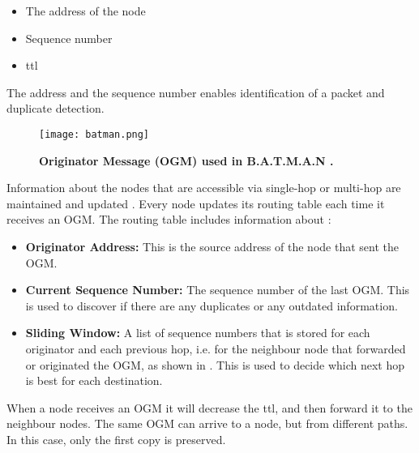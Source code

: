 \begin{itemize}
\item The address of the node
\item Sequence number
\item \gls{ttl} 
\end{itemize}

The address and the sequence number enables identification of a packet and duplicate detection. 

\begin{figure}[b]
  \centering
    \texttt{[image: batman.png]}
     \caption[Originator Message in B.A.T.M.A.N]{\textbf{Originator Message (OGM) used in B.A.T.M.A.N \cite{batman2}.}}
\label{fig:batman} 
\end{figure}


Information about the nodes that are accessible via single-hop or multi-hop are maintained and updated \cite{batman}. Every node updates its routing table each time it receives an OGM. The routing table includes information about \cite{batman2}:

\begin{itemize}
  \item \textbf{Originator Address:} This is the source address of the node that sent the OGM.
  \item \textbf{Current Sequence Number:} The sequence number of the last OGM. This is used to discover if there are any duplicates or any outdated information.
  \item \textbf{Sliding Window:} A list of sequence numbers that is stored for each originator and each previous hop, i.e. for the neighbour node that forwarded or originated the OGM, as shown in . This is used to decide which next hop is best for each destination. 
\end{itemize}

When a node receives an OGM it will decrease the \gls{ttl}, and then forward it to the neighbour nodes. The same OGM can arrive to a node, but from different paths. In this case, only the first copy is preserved. 


